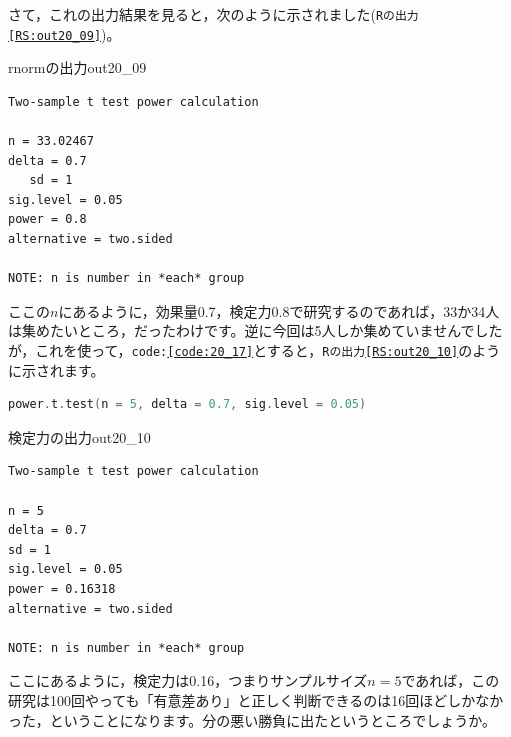 \documentclass{ltjsbook}
\begin{document}
さて，これの出力結果を見ると，次のように示されました(\texttt{Rの出力\ref{RS:out20_09}})。
\begin{Rscreen}{rnormの出力}{out20_09}
	\begin{verbatim}
Two-sample t test power calculation 

n = 33.02467
delta = 0.7
   sd = 1
sig.level = 0.05
power = 0.8
alternative = two.sided

NOTE: n is number in *each* group
\end{verbatim}
\end{Rscreen}
ここの$n$にあるように，効果量0.7，検定力0.8で研究するのであれば，33か34人は集めたいところ，だったわけです。逆に今回は5人しか集めていませんでしたが，これを使って，\texttt{code:\ref{code:20_17}}とすると，\texttt{Rの出力\ref{RS:out20_10}}のように示されます。

\begin{lstlisting}[language=c++,label={code:20_17},caption={power.t.testで$n$を固定}]
power.t.test(n = 5, delta = 0.7, sig.level = 0.05)
\end{lstlisting}

\begin{Rscreen}{検定力の出力}{out20_10}
	\begin{verbatim}
Two-sample t test power calculation 

n = 5
delta = 0.7
sd = 1
sig.level = 0.05
power = 0.16318
alternative = two.sided

NOTE: n is number in *each* group
\end{verbatim}
\end{Rscreen}
ここにあるように，検定力は0.16，つまりサンプルサイズ$n=5$であれば，この研究は100回やっても「有意差あり」と正しく判断できるのは16回ほどしかなかった，ということになります。分の悪い勝負に出たというところでしょうか。
\end{document}
